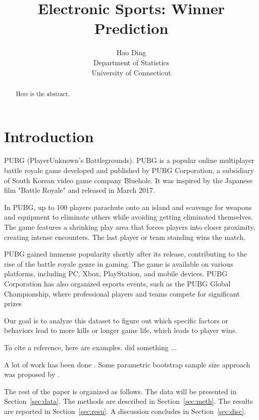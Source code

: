 \documentclass[12pt]{article}
\title{Electronic Sports: Winner Prediction}
\author{Hao Ding\\
  Department of Statistics\\
  University of Connecticut
}
\begin{document}
\maketitle

\begin{abstract}
Here is the abstract.  
\end{abstract}


\section{Introduction}
\label{sec:intro}

PUBG (PlayerUnknown's Battlegrounds). PUBG is a popular online multiplayer battle royale game developed and published by PUBG Corporation, a subsidiary of South Korean video game company Bluehole. It was inspired by the Japanese film "Battle Royale" and released in March 2017.

In PUBG, up to 100 players parachute onto an island and scavenge for weapons and equipment to eliminate others while avoiding getting eliminated themselves. The game features a shrinking play area that forces players into closer proximity, creating intense encounters. The last player or team standing wins the match.

PUBG gained immense popularity shortly after its release, contributing to the rise of the battle royale genre in gaming. The game is available on various platforms, including PC, Xbox, PlayStation, and mobile devices. PUBG Corporation has also organized esports events, such as the PUBG Global Championship, where professional players and teams compete for significant prizes


Our goal is to analyze this dataset to figure out which specific factors or behaviors lead to more kills or longer game life, which leads to player wins.


\lipsum[1-3]

To cite a reference, here are examples.
\citet{xie2015dynamic} did something ... \lipsum[1]

A lot of work has been done \citep[e.g.,][]{xie2015dynamic}.
\lipsum[2]
Some parametric bootstrap sample size approach was proposed by
\citet{dwivedi2017analysis}. 


The rest of the paper is organized as follows.
The data will be presented in Section~\ref{sec:data}.
The methods are described in Section~\ref{sec:meth}.
The results are reported in Section~\ref{sec:resu}.
A discussion concludes in Section~\ref{sec:disc}.
\end{document}
